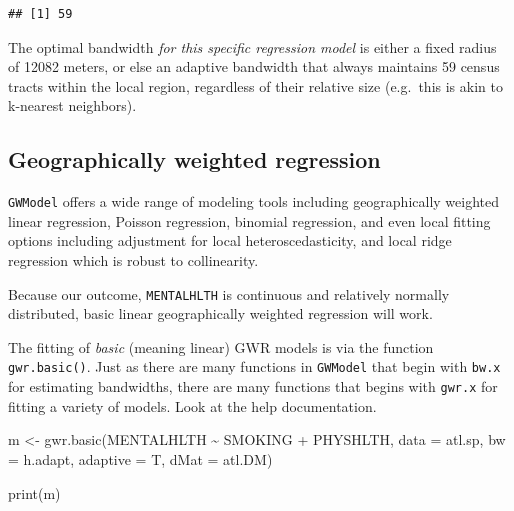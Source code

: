 \documentclass[
]{book}
\newenvironment{Shaded}{\begin{snugshade}}{\end{snugshade}}
\newcommand{\AttributeTok}[1]{\textcolor[rgb]{0.77,0.63,0.00}{#1}}
\newcommand{\FunctionTok}[1]{\textcolor[rgb]{0.00,0.00,0.00}{#1}}
\newcommand{\NormalTok}[1]{#1}
\newcommand{\OtherTok}[1]{\textcolor[rgb]{0.56,0.35,0.01}{#1}}
\newcommand{\SpecialCharTok}[1]{\textcolor[rgb]{0.00,0.00,0.00}{#1}}
\begin{document}
\begin{verbatim}
## [1] 59
\end{verbatim}

The optimal bandwidth \emph{for this specific regression model} is either a fixed radius of 12082 meters, or else an adaptive bandwidth that always maintains 59 census tracts within the local region, regardless of their relative size (e.g.~this is akin to k-nearest neighbors).

\hypertarget{geographically-weighted-regression}{%
\subsection{Geographically weighted regression}\label{geographically-weighted-regression}}

\texttt{GWModel} offers a wide range of modeling tools including geographically weighted linear regression, Poisson regression, binomial regression, and even local fitting options including adjustment for local heteroscedasticity, and local ridge regression which is robust to collinearity.

Because our outcome, \texttt{MENTALHLTH} is continuous and relatively normally distributed, basic linear geographically weighted regression will work.

The fitting of \emph{basic} (meaning linear) GWR models is via the function \texttt{gwr.basic()}. Just as there are many functions in \texttt{GWModel} that begin with \texttt{bw.x} for estimating bandwidths, there are many functions that begins with \texttt{gwr.x} for fitting a variety of models. Look at the help documentation.

\begin{Shaded}
\begin{Highlighting}[]
\NormalTok{m }\OtherTok{\textless{}{-}} \FunctionTok{gwr.basic}\NormalTok{(MENTALHLTH }\SpecialCharTok{\textasciitilde{}}\NormalTok{ SMOKING }\SpecialCharTok{+}\NormalTok{ PHYSHLTH, }
             \AttributeTok{data =}\NormalTok{ atl.sp, }
             \AttributeTok{bw =}\NormalTok{ h.adapt,}
             \AttributeTok{adaptive =}\NormalTok{ T,}
             \AttributeTok{dMat =}\NormalTok{ atl.DM)}
\end{Highlighting}
\end{Shaded}

\begin{Shaded}
\begin{Highlighting}[]
\FunctionTok{print}\NormalTok{(m)}
\end{Highlighting}
\end{Shaded}
\end{document}
